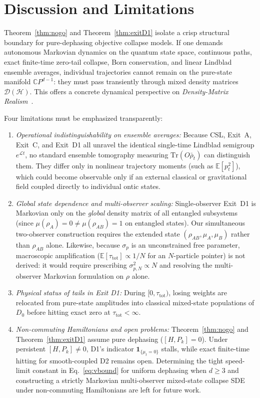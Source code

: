 \documentclass[aps,pra,10pt,twocolumn,superscriptaddress,amsmath,amssymb,floatfix]{revtex4-2}
\newcommand{\Tr}{\mathrm{Tr}}
\newcommand{\E}{\mathbb{E}}
\begin{document}
\section{Discussion and Limitations}
\label{sec:discussion}

Theorem~\ref{thm:nogo} and Theorem~\ref{thm:exitD1} isolate a crisp structural boundary for pure-dephasing objective collapse models. If one demands autonomous Markovian dynamics on the quantum state space, continuous paths, exact finite-time zero-tail collapse, Born conservation, and linear Lindblad ensemble averages, individual trajectories cannot remain on the pure-state manifold $\mathbb{C}P^{d-1}$: they must pass transiently through mixed density matrices $\mathcal{D}(\mathcal{H})$. This offers a concrete dynamical perspective on \emph{Density-Matrix Realism}~\cite{Chen2019}.

Four limitations must be emphasized transparently:
\begin{enumerate}
\item \emph{Operational indistinguishability on ensemble averages:} Because CSL, Exit~A, Exit~C, and Exit~D1 all unravel the identical single-time Lindblad semigroup $e^{\mathcal{L}t}$, no standard ensemble tomography measuring $\Tr(O\bar{\rho}_t)$ can distinguish them. They differ only in nonlinear trajectory moments (such as $\E[p_t^2]$), which could become observable only if an external classical or gravitational field coupled directly to individual ontic states.
\item \emph{Global state dependence and multi-observer scaling:} Single-observer Exit~D1 is Markovian only on the \emph{global} density matrix of all entangled subsystems (since $\mu(\rho_A)=0 \ne \mu(\rho_{AB})=1$ on entangled states). Our simultaneous two-observer construction requires the extended state $(\rho_{AB},\mu_A,\mu_B)$ rather than $\rho_{AB}$ alone. Likewise, because $\sigma_p$ is an unconstrained free parameter, macroscopic amplification ($\E[\tau_{\mathrm{tot}}]\propto 1/N$ for an $N$-particle pointer) is not derived: it would require prescribing $\sigma_{p,N}^2 \propto N$ and resolving the multi-observer Markovian formulation on $\rho$ alone.
\item \emph{Physical status of tails in Exit D1:} During $[0, \tau_{\mathrm{tot}})$, losing weights are relocated from pure-state amplitudes into classical mixed-state populations of $D_0$ before hitting exact zero at $\tau_{\mathrm{tot}} < \infty$.
\item \emph{Non-commuting Hamiltonians and open problems:} Theorem~\ref{thm:nogo} and Theorem~\ref{thm:exitD1} assume pure dephasing ($[H,P_k]=0$). Under persistent $[H,P_k]\ne 0$, D1's indicator $\mathbf{1}_{\{\mu_t=0\}}$ stalls, while exact finite-time hitting for smooth-coupled D2 remains open. Determining the tight speed-limit constant in Eq.~\eqref{eq:vbound} for uniform dephasing when $d \ge 3$ and constructing a strictly Markovian multi-observer mixed-state collapse SDE under non-commuting Hamiltonians are left for future work.
\end{enumerate}
\end{document}
